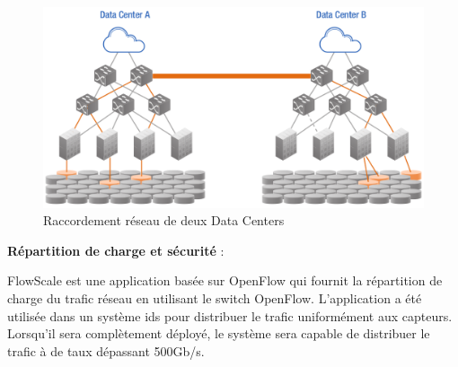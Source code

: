 \begin{figure}[!h] %
\includegraphics[width=15cm]{images/DataCenterL2Bridging.png} %
\caption{ Raccordement réseau de deux Data Centers \cite{ODCAusageScenarios}} %
\label{imgDCL2B} %
\end{figure} %

\textbf{Répartition de charge et sécurité} : 

FlowScale est une application basée sur OpenFlow qui fournit la répartition de charge du trafic réseau en utilisant le switch OpenFlow. L'application a été utilisée dans un système \gls{ids} pour distribuer le trafic uniformément aux capteurs. Lorsqu'il sera complètement déployé, le système sera capable de distribuer le trafic à de taux dépassant 500Gb/s.  \cite{FlowScale}



